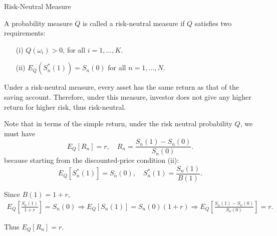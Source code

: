 \documentclass{beamer}
\begin{document}
\begin{frame}{Risk-Neutral Measure}

    {\footnotesize \footnotesize
        A probability measure $Q$ is called a risk-neutral measure if $Q$ satisfies two requirements:
    \begin{enumerate}
    \item[(i)] $Q(\omega_i) > 0$, for all $i = 1, \ldots, K$.
    \item[(ii)] $E_Q(S_n^*(1)) = S_n(0)$ for all $n = 1, \ldots, N$.
    \end{enumerate}

    Under a risk-neutral measure, every asset has the same return as that 
    of the saving account. Therefore, under this measure, 
    investor does not give any higher return for higher risk, thus risk-neutral.
    \vspace{1em}
    \par  \pause Note that in terms of the simple return, under the risk neutral probability $Q$, we must have
    \[
    E_Q[R_n] = r, \quad R_n = \frac{S_n(1) - S_n(0)}{S_n(0)}.
    \]
    because starting from the discounted-price condition (ii):  
    \[
    E_Q[S_n^*(1)] = S_n(0), \quad S_n^*(1) = \frac{S_n(1)}{B(1)}.
    \]

    Since $B(1) = 1 + r$,  
    \begin{align*}
    E_Q\left[\frac{S_n(1)}{1 + r}\right] = S_n(0) 
    \Rightarrow E_Q[S_n(1)] = S_n(0)(1 + r) 
    \Rightarrow E_Q\left[\frac{S_n(1) - S_n(0)}{S_n(0)}\right] = r.
    \end{align*}

    Thus $E_Q[R_n] = r$.

    }
\end{frame}
\end{document}
